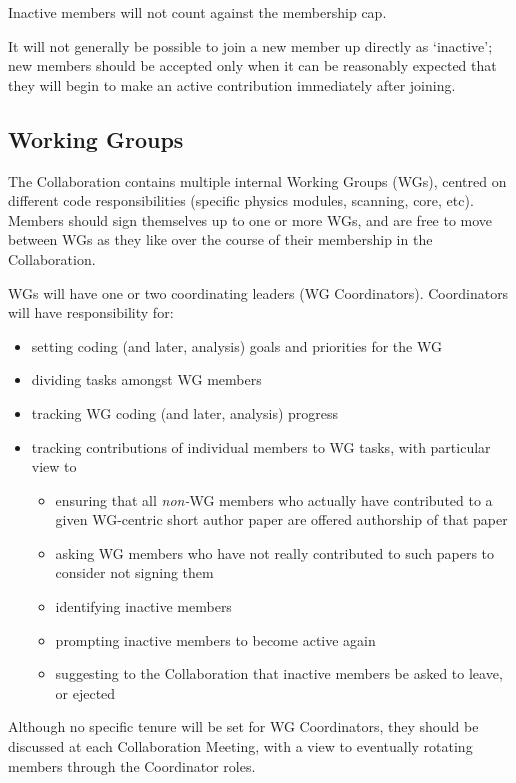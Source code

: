 Inactive members will not count against the membership cap.

It will not generally be possible to join a new member up directly as `inactive'; new members should be accepted only when it can be reasonably expected that they will begin to make an active contribution immediately after joining.

\subsection{Working Groups}

The Collaboration contains multiple internal Working Groups (WGs), centred on different code responsibilities (specific physics modules, scanning, core, etc).  Members should sign themselves up to one or more WGs, and are free to move between WGs as they like over the course of their membership in the Collaboration.

WGs will have one or two coordinating leaders (WG Coordinators).  Coordinators will have responsibility for:\begin{itemize}
\item setting coding (and later, analysis) goals and priorities for the WG
\item dividing tasks amongst WG members
\item tracking WG coding (and later, analysis) progress
\item tracking contributions of individual members to WG tasks, with particular view to\begin{itemize}
  \item ensuring that all \textit{non-}WG members who actually have contributed to a given WG-centric short author paper are offered authorship of that paper
  \item asking WG members who have not really contributed to such papers to consider not signing them
  \item identifying inactive members 
  \item prompting inactive members to become active again
  \item suggesting to the Collaboration that inactive members be asked to leave, or ejected 
  \end{itemize}
\end{itemize}

Although no specific tenure will be set for WG Coordinators, they should be discussed at each Collaboration Meeting, with a view to eventually rotating members through the Coordinator roles.

